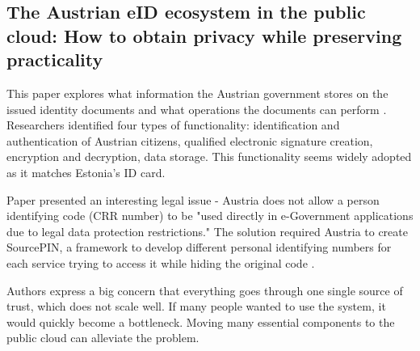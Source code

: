 


\subsection{The Austrian eID ecosystem in the public cloud: How to obtain privacy while preserving practicality}

This paper explores what information the Austrian government stores on the issued identity documents and what operations the documents can perform \cite{ZWATTENDORFER201635}. Researchers identified four types of functionality: identification and authentication of Austrian citizens, qualified electronic signature creation, encryption and decryption, data storage. This functionality seems widely adopted as it matches Estonia's ID card.

Paper presented an interesting legal issue - Austria does not allow a person identifying code (CRR number) to be "used directly in e-Government applications due to legal data protection restrictions." The solution required Austria to create SourcePIN, a framework to develop different personal identifying numbers for each service trying to access it while hiding the original code \cite{ZWATTENDORFER201635,austria-eid-presentation}.

Authors express a big concern that everything goes through one single source of trust, which does not scale well. If many people wanted to use the system, it would quickly become a bottleneck. Moving many essential components to the public cloud can alleviate the problem.

